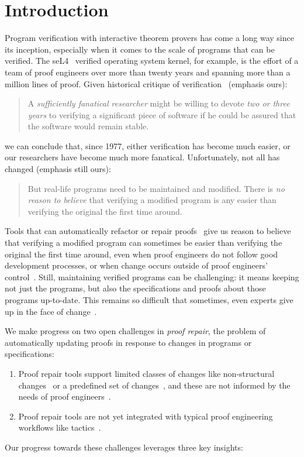 \section{Introduction}

Program verification with interactive theorem provers has come a long way since its inception,
especially when it comes to the scale of programs that can be verified.
The seL4~\cite{Klein2009} verified operating system kernel, for example,
is the effort of a team of proof engineers over more than twenty years and spanning more than
a million lines of proof.
Given historical critique of verification~\cite{DeMillo1977} (emphasis ours):

\begin{quote}
A \textit{sufficiently fanatical researcher}
might be willing to devote \textit{two or 
three years} to verifying a significant 
piece of software if he could be 
assured that the software would remain stable.
\end{quote}
we can conclude that, since 1977, either verification has become much easier,
or our researchers have become much more fanatical. Unfortunately, not all has changed (emphasis still ours):

\begin{quote}
But real-life programs need to 
be maintained and modified. 
There is \textit{no reason to believe} that verifying a modified program is any 
easier than verifying the original the 
first time around.
\end{quote}
Tools that can automatically refactor or repair proofs~\cite{wibergh2019, WhitesidePhD, Dietrich2013, adams2015, Bourke12, Roe2016, robert2018, pumpkinpatch}
give us reason to believe that verifying a modified program can sometimes be easier than verifying the original the first time
around, even when proof engineers do not follow good development processes,
or when change occurs outside of proof engineers' control~\cite{PGL-045}.
Still, maintaining verified programs can be challenging: it means keeping not just the programs, but also the
specifications and proofs about those programs up-to-date.
This remains so difficult that sometimes, even experts give up in the face of change~\cite{replica}.

We make progress on two open challenges in \textit{proof repair}, the problem of automatically updating proofs in response
to changes in programs or specifications:

\begin{enumerate}
\item Proof repair tools support limited classes of changes like non-structural changes~\cite{pumpkinpatch} or a predefined set
of changes~\cite{robert2018, wibergh2019}, and these are not informed by the needs of proof engineers~\cite{replica}.
\item Proof repair tools are not yet integrated with typical proof engineering workflows like tactics~\cite{PGL-045, pumpkinpatch, robert2018}.
\end{enumerate}
Our progress towards these challenges leverages three key insights:

